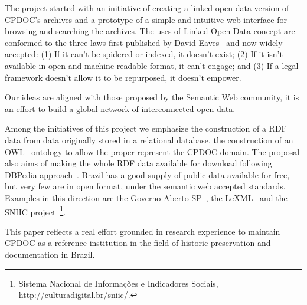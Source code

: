 The project started with an initiative of creating a linked open data
version of CPDOC's archives and a prototype of a simple and intuitive
web interface for browsing and searching the archives. The uses of
Linked Open Data concept are conformed to the three laws first
published by David Eaves~\cite{3-law} and now widely accepted: (1) If
it can't be spidered or indexed, it doesn't exist; (2) If it isn't
available in open and machine readable format, it can't engage; and
(3) If a legal framework doesn't allow it to be repurposed, it doesn't
empower.
  
Our ideas are aligned with those proposed by the Semantic Web
community, it is an effort to build a global network of interconnected
open data. 

Among the initiatives of this project we emphasize the construction of
a RDF~\cite{rdf-primer} data from data originally stored in a
relational database, the construction of an OWL~\cite{owl} ontology to
allow the proper represent the CPDOC domain.
The proposal also aims of making the whole RDF data available for
download following DBPedia approach~\cite{dbpedia}. Brazil has a good
supply of public data available for free, but very few are in open
format, under the semantic web accepted standards. Examples in this
direction are the Governo Aberto SP~\cite{gasp}, the
LeXML~\cite{lexml} and the SNIIC project~\footnote{Sistema Nacional de
  Informações e Indicadores Sociais,
  \url{http://culturadigital.br/sniic/}.}.
   
This paper reflects a real effort grounded in research experience to
maintain CPDOC as a reference institution in the field of historic
preservation and documentation in Brazil.



